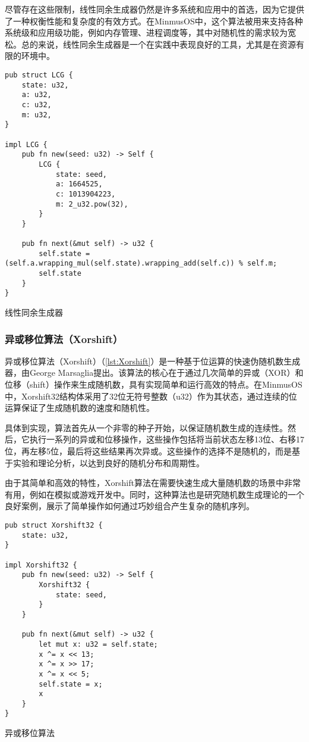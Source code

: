 尽管存在这些限制，线性同余生成器仍然是许多系统和应用中的首选，因为它提供了一种权衡性能和复杂度的有效方式。在MinmusOS中，这个算法被用来支持各种系统级和应用级功能，例如内存管理、进程调度等，其中对随机性的需求较为宽松。总的来说，线性同余生成器是一个在实践中表现良好的工具，尤其是在资源有限的环境中。

\begin{listing}[htbp]
    \begin{verbatim}
pub struct LCG {
    state: u32,
    a: u32,
    c: u32,
    m: u32,
}

impl LCG {
    pub fn new(seed: u32) -> Self {
        LCG {
            state: seed,
            a: 1664525,
            c: 1013904223,
            m: 2_u32.pow(32),
        }
    }

    pub fn next(&mut self) -> u32 {
        self.state = (self.a.wrapping_mul(self.state).wrapping_add(self.c)) % self.m;
        self.state
    }
}
    \end{verbatim}
    \caption{线性同余生成器}\label{lst:LinearCongruentialGenerator}
\end{listing}

\subsubsection{异或移位算法（Xorshift）}

异或移位算法（Xorshift）（\cref{lst:Xorshift}）是一种基于位运算的快速伪随机数生成器，由George Marsaglia提出。该算法的核心在于通过几次简单的异或（XOR）和位移（shift）操作来生成随机数，具有实现简单和运行高效的特点。在MinmusOS中，Xorshift32结构体采用了32位无符号整数（u32）作为其状态，通过连续的位运算保证了生成随机数的速度和随机性。

具体到实现，算法首先从一个非零的种子开始，以保证随机数生成的连续性。然后，它执行一系列的异或和位移操作，这些操作包括将当前状态左移13位、右移17位，再左移5位，最后将这些结果再次异或。这些操作的选择不是随机的，而是基于实验和理论分析，以达到良好的随机分布和周期性。

由于其简单和高效的特性，Xorshift算法在需要快速生成大量随机数的场景中非常有用，例如在模拟或游戏开发中。同时，这种算法也是研究随机数生成理论的一个良好案例，展示了简单操作如何通过巧妙组合产生复杂的随机序列。

\begin{listing}[htbp]
    \begin{verbatim}
pub struct Xorshift32 {
    state: u32,
}

impl Xorshift32 {
    pub fn new(seed: u32) -> Self {
        Xorshift32 {
            state: seed,
        }
    }

    pub fn next(&mut self) -> u32 {
        let mut x: u32 = self.state;
        x ^= x << 13;
        x ^= x >> 17;
        x ^= x << 5;
        self.state = x;
        x
    }
}
    \end{verbatim}
    \caption{异或移位算法}\label{lst:Xorshift}
\end{listing}

